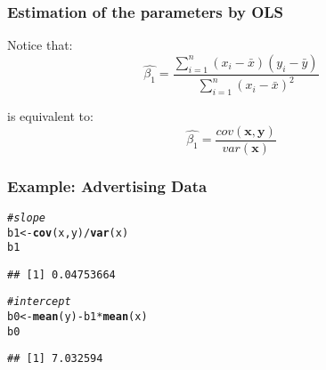\documentclass[12pt]{beamer}\usepackage[]{graphicx}\usepackage[]{color}
\makeatletter
\newcommand{\hlcom}[1]{\textcolor[rgb]{0.678,0.584,0.686}{\textit{#1}}}%
\newcommand{\hlopt}[1]{\textcolor[rgb]{0,0,0}{#1}}%
\newcommand{\hlstd}[1]{\textcolor[rgb]{0.345,0.345,0.345}{#1}}%
\newcommand{\hlkwb}[1]{\textcolor[rgb]{0.69,0.353,0.396}{#1}}%
\newcommand{\hlkwd}[1]{\textcolor[rgb]{0.737,0.353,0.396}{\textbf{#1}}}%
\newenvironment{kframe}{%
 \def\at@end@of@kframe{}%
 \ifinner\ifhmode%
  \def\at@end@of@kframe{\end{minipage}}%
  \begin{minipage}{\columnwidth}%
 \fi\fi%
 \def\FrameCommand##1{\hskip\@totalleftmargin \hskip-\fboxsep
 \colorbox{shadecolor}{##1}\hskip-\fboxsep
     \hskip-\linewidth \hskip-\@totalleftmargin \hskip\columnwidth}%
 \MakeFramed {\advance\hsize-\width
   \@totalleftmargin\z@ \linewidth\hsize
   \@setminipage}}%
 {\par\unskip\endMakeFramed%
 \at@end@of@kframe}
\newenvironment{knitrout}{}{} %
\makeatother
\begin{document}

\begin{frame}
\frametitle{Estimation of the parameters by OLS}

Notice that:
$$
\hat{\beta_1} = \frac{\sum_{i=1}^{n} (x_i - \bar{x})(y_i - \bar{y})}{\sum_{i=1}^{n} (x_i - \bar{x})^2}
$$

is equivalent to:
$$
\hat{\beta_1} = \frac{cov(\mathbf{x}, \mathbf{y})}{var(\mathbf{x})}
$$

\end{frame}




\begin{frame}[fragile]
\frametitle{Example: Advertising Data}

\begin{knitrout}\footnotesize
{}\color{fgcolor}\begin{kframe}
\begin{alltt}
\hlcom{# slope}
\hlstd{b1} \hlkwb{<-} \hlkwd{cov}\hlstd{(x, y)} \hlopt{/} \hlkwd{var}\hlstd{(x)}
\hlstd{b1}
\end{alltt}
\begin{verbatim}
## [1] 0.04753664
\end{verbatim}
\begin{alltt}
\hlcom{# intercept}
\hlstd{b0} \hlkwb{<-} \hlkwd{mean}\hlstd{(y)} \hlopt{-} \hlstd{b1} \hlopt{*} \hlkwd{mean}\hlstd{(x)}
\hlstd{b0}
\end{alltt}
\begin{verbatim}
## [1] 7.032594
\end{verbatim}
\end{kframe}
\end{knitrout}

\end{frame}
\end{document}
